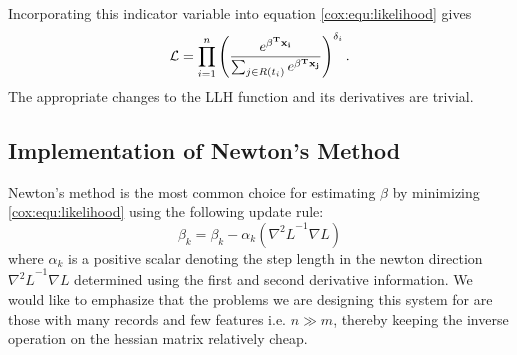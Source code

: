 Incorporating this indicator variable into equation \ref{cox:equ:likelihood} gives
\begin{equation}\label{cox:equ:likelihood-censoring}
\mathcal{L} = \prod_{i = 1}^n \left(  \frac{e^{\bold{\beta^T x_i} }}{ \sum_{j \in R(t_i)} e^{\bold{\beta^T x_j}}} \right)^{\delta_i}.
\end{equation}
The appropriate changes to the LLH function and its derivatives are trivial.   


\subsection{Implementation of Newton's Method}
Newton's method is the most common choice for estimating $\beta$ by minimizing \ref{cox:equ:likelihood} using the following update rule:
\begin{equation}
\beta_{k} = \beta_{k} - \alpha_k \left( {\nabla^2 L}^{-1} \nabla L \right)
\end{equation}
where $\alpha_k$ is a positive scalar denoting the step length in the newton direction ${\nabla^2 L}^{-1} \nabla L$ determined using the first and second derivative information. We would like to emphasize that the problems we are designing this system for are those with many records and few features i.e. $n \gg m$, thereby keeping the inverse operation on the hessian matrix relatively cheap.

